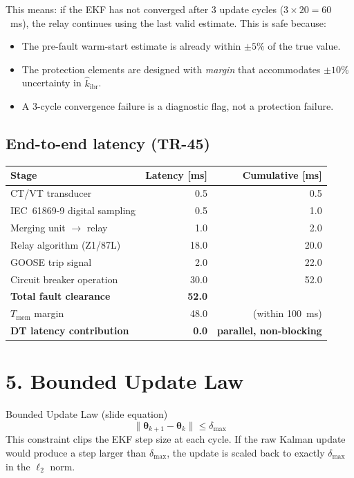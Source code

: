 \documentclass[12pt,a4paper]{article}
\begin{document}
This means: if the EKF has not converged after 3 update cycles ($3 \times 20 = 60$~ms),
the relay continues using the last valid estimate. This is safe because:
\begin{itemize}[nosep]
  \item The pre-fault warm-start estimate is already within $\pm 5\%$ of the true value.
  \item The protection elements are designed with \emph{margin} that accommodates
        $\pm 10\%$ uncertainty in $\hat{k}_\mathrm{ibr}$.
  \item A 3-cycle convergence failure is a diagnostic flag, not a protection failure.
\end{itemize}

\subsection{End-to-end latency (TR-45)}

\begin{center}
\begin{tabular}{@{}lrr@{}}
\toprule
\textbf{Stage} & \textbf{Latency [ms]} & \textbf{Cumulative [ms]}\\
\midrule
CT/VT transducer          & 0.5  & 0.5 \\
IEC~61869-9 digital sampling & 0.5 & 1.0 \\
Merging unit $\to$ relay  & 1.0  & 2.0 \\
Relay algorithm (Z1/87L)  & 18.0 & 20.0 \\
GOOSE trip signal         & 2.0  & 22.0 \\
Circuit breaker operation & 30.0 & 52.0 \\
\midrule
\textbf{Total fault clearance} & \textbf{52.0} & \\
$T_\mathrm{mem}$ margin   & 48.0 & (within 100~ms) \\
\textbf{DT latency contribution} & \textbf{0.0} & \textbf{parallel, non-blocking} \\
\bottomrule
\end{tabular}
\end{center}

\section{5.\; Bounded Update Law}

\begin{formulabox}{Bounded Update Law (slide equation)}
\begin{equation}
  \|\boldsymbol{\theta}_{k+1} - \boldsymbol{\theta}_k\| \leq \delta_\mathrm{max}
  \label{eq:bounded}
\end{equation}
This constraint clips the EKF step size at each cycle. If the raw Kalman update
would produce a step larger than $\delta_\mathrm{max}$, the update is scaled back
to exactly $\delta_\mathrm{max}$ in the $\ell_2$ norm.
\end{formulabox}
\end{document}
